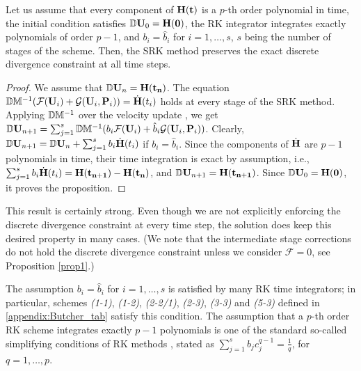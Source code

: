 \begin{proposition}
\label{prop2}
Let us assume that every component of $\bf{H}(t)$ is a $p$-th order polynomial in time, the initial condition satisfies $\mathbb{D} {\bf U}_0 = \bf{H}(0)$,  the RK integrator integrates exactly polynomials of order $p-1$, and $b_i = \hat{b}_i$ for $i = 1, \ldots, s$, $s$ being the number of stages of the scheme. Then, the SRK method preserves the exact discrete divergence constraint at all time steps.
\end{proposition}

\begin{proof}
We assume that $\mathbb{D}{\bf U}_n = \bf{H}(t_n)$. The equation $\mathbb{D}\mathbb{M}^{-1} (\mathcal{F}({\bf U}_i) + \mathcal{G}({\bf U}_i,{\bf P}_i)) = \dot{\bf{H}}(t_i)$ holds at every stage of the SRK method. Applying $\mathbb{D}\mathbb{M}^{-1}$ over the velocity update , we get $\mathbb{D}{\bf U}_{n+1} = \sum_{j=1}^s \mathbb{D}\mathbb{M}^{-1} ( b_i \mathcal{F}({\bf U}_i) + \hat{b}_i \mathcal{G}({\bf U}_i,{\bf P}_i))$. Clearly, $\mathbb{D}{\bf U}_{n+1} =\mathbb{D}{\bf U}_n + \sum_{j=1}^s b_i \dot{\bf{H}}(t_i)$ if $b_i = \hat{b}_i$. Since the components of $\dot{\bf{H}}$ are $p-1$ polynomials in time, their time integration is exact by assumption, i.e., $\sum_{j=1}^s b_i \dot{\bf{H}}(t_i) = \bf{H}(t_{n+1}) - \bf{H}(t_n)$, and $\mathbb{D}{\bf U}_{n+1} = \bf{H}(t_{n+1})$. Since $\mathbb{D}{\bf U}_0 = \bf{H}(0)$, it proves the proposition.
\end{proof}

This result is certainly strong. Even though we are not explicitly enforcing the discrete divergence constraint at every time step, the solution does keep this desired property in many cases.  (We note that the intermediate stage corrections do not hold the discrete divergence constraint unless we consider $\mathcal{F} = 0$, see Proposition \ref{prop1}.) 

\begin{remark}
The assumption $b_i = \hat{b}_i$ for $i = 1, \ldots, s$ is satisfied by many RK time integrators; in particular, schemes \textit{(1-1)}, \textit{(1-2)}, \textit{(2-2/1)}, \textit{(2-3)}, \textit{(3-3)} and \textit{(5-3)} defined in \ref{appendix:Butcher_tab} satisfy this condition. The assumption that a $p$-th order RK scheme integrates exactly $p-1$ polynomials is one of the standard so-called simplifying conditions of RK methods \cite{hairer_solving_1993}, stated as $\sum_{j=1}^s b_j c_j^{q-1} = \frac{1}{q}$, for $q = 1, \ldots, p$. %
\end{remark}

